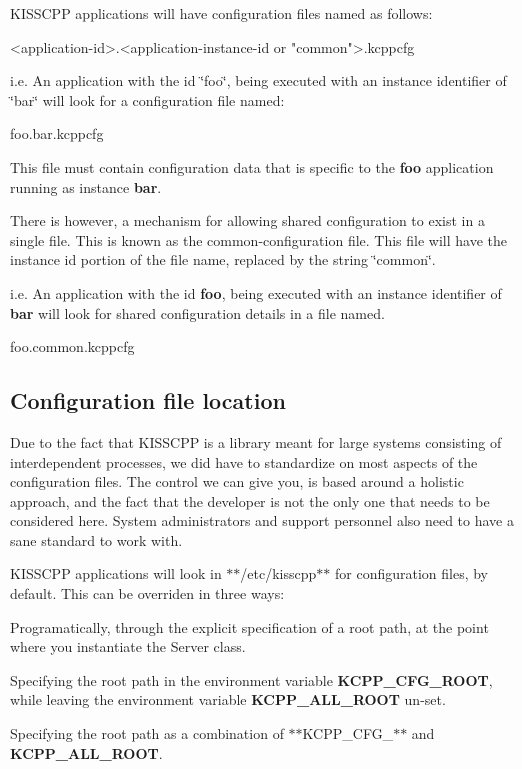 K\-I\-S\-S\-C\-P\-P applications will have configuration files named as follows\-:


\begin{DoxyCode}
<application-\textcolor{keywordtype}{id}>.<application-instance-\textcolor{keywordtype}{id} or \textcolor{stringliteral}{"common"}>.kcppcfg
\end{DoxyCode}


i.\-e. An application with the id \char`\"{}foo\char`\"{}, being executed with an instance identifier of \char`\"{}bar\char`\"{} will look for a configuration file named\-:


\begin{DoxyCode}
foo.bar.kcppcfg
\end{DoxyCode}


This file must contain configuration data that is specific to the {\bfseries foo} application running as instance {\bfseries bar}.

There is however, a mechanism for allowing shared configuration to exist in a single file. This is known as the common-\/configuration file. This file will have the instance id portion of the file name, replaced by the string \char`\"{}common\char`\"{}.

i.\-e. An application with the id {\bfseries foo}, being executed with an instance identifier of {\bfseries bar} will look for shared configuration details in a file named.


\begin{DoxyCode}
foo.common.kcppcfg
\end{DoxyCode}


\subsection*{Configuration file location}

Due to the fact that K\-I\-S\-S\-C\-P\-P is a library meant for large systems consisting of interdependent processes, we did have to standardize on most aspects of the configuration files. The control we can give you, is based around a holistic approach, and the fact that the developer is not the only one that needs to be considered here. System administrators and support personnel also need to have a sane standard to work with.

K\-I\-S\-S\-C\-P\-P applications will look in $\ast$$\ast$/etc/kisscpp$\ast$$\ast$ for configuration files, by default. This can be overriden in three ways\-:


\begin{DoxyEnumerate}
\item Programatically, through the explicit specification of a root path, at the point where you instantiate the Server class.
\item Specifying the root path in the environment variable {\bfseries K\-C\-P\-P\-\_\-\-C\-F\-G\-\_\-\-R\-O\-O\-T}, while leaving the environment variable {\bfseries K\-C\-P\-P\-\_\-\-A\-L\-L\-\_\-\-R\-O\-O\-T} un-\/set.
\item Specifying the root path as a combination of $\ast$$\ast$\-K\-C\-P\-P\-\_\-\-C\-F\-G\-\_\-$\ast$$\ast$ and {\bfseries K\-C\-P\-P\-\_\-\-A\-L\-L\-\_\-\-R\-O\-O\-T}.
\end{DoxyEnumerate}

